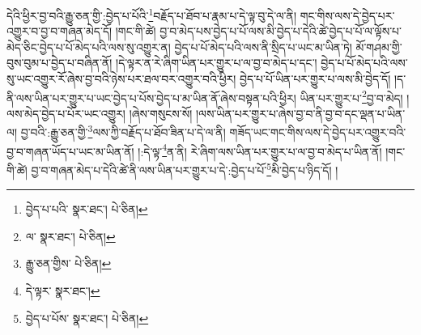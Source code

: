 དེའི་ཕྱིར་བྱ་བའི་རྒྱུ་ཅན་གྱི་:བྱེད་པ་པོའི་\footnote{བྱེད་པ་པའི་  སྣར་ཐང་།  པེ་ཅིན། }བརྗོད་པ་ཐོབ་པ་རྣམ་པ་དེ་ལྟ་བུ་དེ་ལ་ནི། གང་གིས་ལས་དེ་བྱེད་པར་འགྱུར་བ་བྱ་བ་གཞན་མེད་དོ། །གང་གི་ཚེ། བྱ་བ་མེད་པས་བྱེད་པ་པོ་ལས་མི་བྱེད་པ་དེའི་ཚེ་བྱེད་པ་པོ་ལ་ལྟོས་པ་མེད་ཅིང་བྱེད་པ་པོ་མེད་པའི་ལས་སུ་འགྱུར་ན། བྱེད་པ་པོ་མེད་པའི་ལས་ནི་སྲིད་པ་ཡང་མ་ཡིན་ཏེ། མོ་གཤམ་གྱི་བུས་བུམ་པ་བྱེད་པ་བཞིན་ནོ། །དེ་ལྟར་ན་རེ་ཞིག་ཡིན་པར་གྱུར་པ་ལ་བྱ་བ་མེད་པ་དང་། བྱེད་པ་པོ་མེད་པའི་ལས་སུ་ཡང་འགྱུར་རོ་ཞེས་བྱ་བའི་ཉེས་པར་ཐལ་བར་འགྱུར་བའི་ཕྱིར། བྱེད་པ་པོ་ཡིན་པར་གྱུར་པ་ལས་མི་བྱེད་དོ། །ད་ནི་ལས་ཡིན་པར་གྱུར་པ་ཡང་བྱེད་པ་པོས་བྱེད་པ་མ་ཡིན་ནོ་ཞེས་བསྟན་པའི་ཕྱིར། ཡིན་པར་གྱུར་པ་\footnote{ལ་  སྣར་ཐང་།  པེ་ཅིན། }བྱ་བ་མེད། །ལས་མེད་བྱེད་པ་པོར་ཡང་འགྱུར། །ཞེས་གསུངས་སོ། །ལས་ཡིན་པར་གྱུར་པ་ཞེས་བྱ་བ་ནི་བྱ་བ་དང་ལྡན་པ་ཡིན་ལ། བྱ་བའི་:རྒྱུ་ཅན་གྱི་\footnote{རྒྱུ་ཅན་གྱིས་  པེ་ཅིན། }ལས་ཀྱི་བརྗོད་པ་ཐོབ་ཟིན་པ་དེ་ལ་ནི། གཟོད་ཡང་གང་གིས་ལས་དེ་བྱེད་པར་འགྱུར་བའི་བྱ་བ་གཞན་ཡོད་པ་ཡང་མ་ཡིན་ནོ། །:དེ་ལྟ་\footnote{དེ་ལྟར་  སྣར་ཐང་། }ན་ནི། རེ་ཞིག་ལས་ཡིན་པར་གྱུར་པ་ལ་བྱ་བ་མེད་པ་ཡིན་ནོ། །གང་གི་ཚེ། བྱ་བ་གཞན་མེད་པ་དེའི་ཚེ་ནི་ལས་ཡིན་པར་གྱུར་པ་དེ་:བྱེད་པ་པོ་\footnote{བྱེད་པ་པོས་  སྣར་ཐང་།  པེ་ཅིན། }མི་བྱེད་པ་ཉིད་དོ། །

